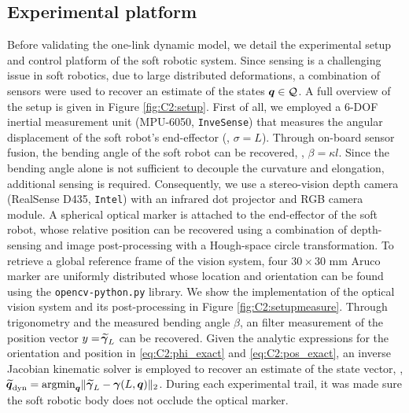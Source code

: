 \subsection{Experimental platform}
\noindent Before validating the one-link dynamic model, we detail the experimental setup and control platform of the soft robotic system. Since sensing is a challenging issue in soft robotics, due to large distributed deformations, a combination of sensors were used to recover an estimate of the states ${\boldsymbol{q}} \in \mathcal{Q}$. A full overview of the setup is given in Figure \ref{fig:C2:setup}. First of all, we employed a 6-DOF inertial measurement unit (MPU-6050, \texttt{InveSense}) that measures the angular displacement of the soft robot's end-effector (\ie, $\sigma = L$). Through on-board sensor fusion, the bending angle of the soft robot can be recovered, \ie, $\beta = \kappa l$. Since the bending angle alone is not sufficient to decouple the curvature and elongation, additional sensing is required. Consequently, we use a stereo-vision depth camera (RealSense D435, \texttt{Intel}) with an infrared dot projector and RGB camera module. A spherical optical marker is attached to the end-effector of the soft robot, whose relative position can be recovered using a combination of depth-sensing and image post-processing with a Hough-space circle transformation. To retrieve a global reference frame of the vision system, four $30\!\times \!30$ \si{\milli \metre} Aruco marker are uniformly distributed whose location and orientation can be found using the \texttt{opencv-python.py} library. We show the implementation of the optical vision system and its post-processing in Figure \ref{fig:C2:setupmeasure}.
Through trigonometry and the measured bending angle $\beta$, an filter measurement of the position vector $y = \widetilde{\!\boldsymbol{\gamma}}_L$ can be recovered. Given the analytic expressions for the orientation and position in \eqref{eq:C2:phi_exact} and \eqref{eq:C2:pos_exact}, an inverse Jacobian kinematic solver is employed to recover an estimate of the state vector, \ie, $\widetilde{\!\boldsymbol{q}}_{\textrm{dyn}} = \textrm{argmin}_{{\boldsymbol{q}}} \lVert \, \widetilde{\!\boldsymbol{\gamma}}_L - {\boldsymbol{\gamma}}(L,{\boldsymbol{q}}) \rVert_2$.
During each experimental trail, it was made sure the soft robotic body does not occlude the optical marker.

